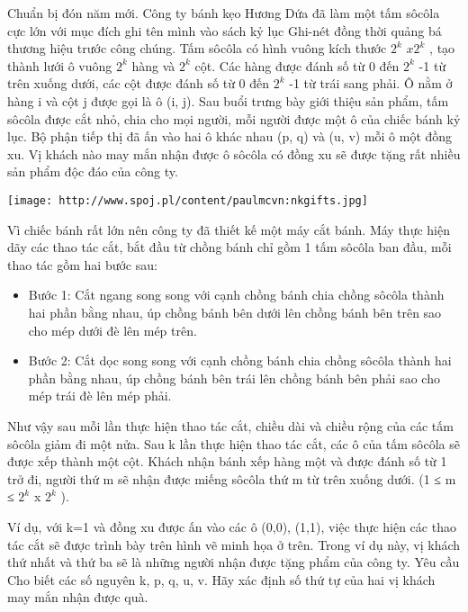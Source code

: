 Chuẩn bị đón năm mới. Công ty bánh kẹo Hương Dứa đã làm một tấm sôcôla cực lớn với mục đích ghi tên mình vào sách kỷ lục Ghi-nét đồng thời quảng bá thương hiệu trước công chúng. Tấm sôcôla có hình vuông kích thước $2^{k}$ $x2^{k}$ , tạo thành lưới ô vuông $2^{k}$ hàng và $2^{k}$ cột. Các hàng được đánh số từ 0 đến $2^{k}$ -1 từ trên xuống dưới, các cột được đánh số từ 0 đến $2^{k}$ -1 từ trái sang phải. Ô nằm ở hàng i và cột j được gọi là ô (i, j). Sau buổi trưng bày giới thiệu sản phẩm, tấm sôcôla được cắt nhỏ, chia cho mọi người, mỗi người được một ô của chiếc bánh kỷ lục. Bộ phận tiếp thị đã ấn vào hai ô khác nhau (p, q) và (u, v) mỗi ô một đồng xu. Vị khách nào may mắn nhận được ô sôcôla có đồng xu sẽ được tặng rất nhiều sản phẩm độc đáo của công ty.


\texttt{[image: http://www.spoj.pl/content/paulmcvn:nkgifts.jpg]}

Vì chiếc bánh rất lớn nên công ty đã thiết kế một máy cắt bánh. Máy thực hiện dãy các thao tác cắt, bắt đầu từ chồng bánh chỉ gồm 1 tấm sôcôla ban đầu, mỗi thao tác gồm hai bước sau:
\begin{itemize}
	\item Bước 1: Cắt ngang song song với cạnh chồng bánh chia chồng sôcôla thành hai phần bằng nhau, úp chồng bánh bên dưới lên chồng bánh bên trên sao cho mép dưới đè lên mép trên.
	\item Bước 2: Cắt dọc song song với cạnh chồng bánh chia chồng sôcôla thành hai phần bằng nhau, úp chồng bánh bên trái lên chồng bánh bên phải sao cho mép trái đè lên mép phải.
\end{itemize}

Như vậy sau mỗi lần thực hiện thao tác cắt, chiều dài và chiều rộng của các tấm sôcôla giảm đi một nửa. Sau k lần thực hiện thao tác cắt, các ô của tấm sôcôla sẽ được xếp thành một cột. Khách nhận bánh xếp hàng một và được đánh số từ 1 trở đi, người thứ m sẽ nhận được miếng sôcôla thứ m từ trên xuống dưới. (1 ≤ m ≤ $2^{k}$ x $2^{k}$ ).

Ví dụ, với k=1 và đồng xu được ấn vào các ô (0,0), (1,1), việc thực hiện các thao tác cắt sẽ được trình bày trên hình vẽ minh họa ở trên. Trong ví dụ này, vị khách thứ nhất và thứ ba sẽ là những người nhận được tặng phẩm của công ty.
Yêu cầu
Cho biết các số nguyên k, p, q, u, v. Hãy xác định số thứ tự của hai vị khách may mắn nhận được quà.